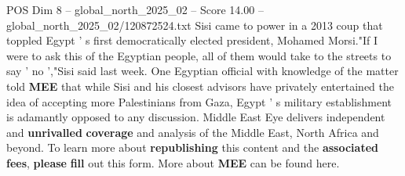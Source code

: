 \begin{textsample}{POS Dim 8 – global\_north\_2025\_02 – Score 14.00 – global\_north\_2025\_02/120872524.txt}
Sisi came to power in a 2013 coup that toppled Egypt ' s first democratically elected president, Mohamed Morsi."If I were to ask this of the Egyptian people, all of them would take to the streets to say ' no ',"Sisi said last week.
One Egyptian official with knowledge of the matter told \textbf{MEE} that while Sisi and his closest advisors have privately entertained the idea of accepting more Palestinians from Gaza, Egypt ' s military establishment is adamantly opposed to any discussion.
Middle East Eye delivers independent and \textbf{unrivalled} \textbf{coverage} and analysis of the Middle East, North Africa and beyond.
To learn more about \textbf{republishing} this content and the \textbf{associated} \textbf{fees}, \textbf{please} \textbf{fill} out this form.
More about \textbf{MEE} can be found here.

\end{textsample}
